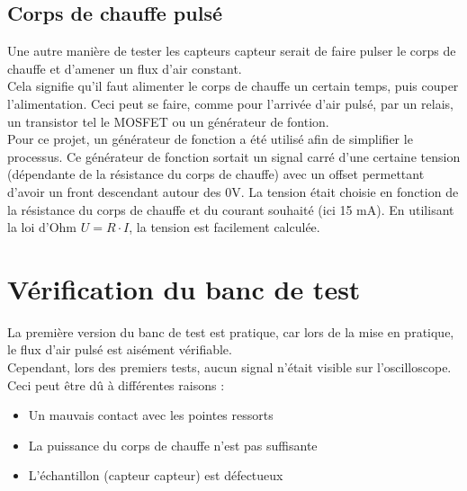 \subsection{Corps de chauffe pulsé}
Une autre manière de tester les capteurs \gls{capteur} serait de faire pulser le corps de chauffe et d'amener un flux d'air constant. \\
Cela signifie qu'il faut alimenter le corps de chauffe un certain temps, puis couper l'alimentation. Ceci peut se faire, comme pour l'arrivée
d'air pulsé, par un relais, un transistor tel le MOSFET ou un générateur de fontion. \\

Pour ce projet, un générateur de fonction a été utilisé afin de simplifier le processus. Ce générateur de fonction sortait un signal carré
d'une certaine tension (dépendante de la résistance du corps de chauffe) avec un offset permettant d'avoir un front descendant autour des
0V. La tension était choisie en fonction de la résistance du corps de chauffe et du courant souhaité (ici 15 mA). En utilisant la loi d'Ohm
$U = R\cdot I$, la tension est facilement calculée.

\section{Vérification du banc de test}
La première version du banc de test est pratique, car lors de la mise en pratique, le flux d'air pulsé est aisément vérifiable. \\
Cependant, lors des premiers tests, aucun signal n'était visible sur l'oscilloscope. Ceci peut être dû à différentes raisons :
\begin{itemize}
    \item Un mauvais contact avec les pointes ressorts\\

    \item La puissance du corps de chauffe n'est pas suffisante\\

    \item L'échantillon (capteur \gls{capteur}) est défectueux\\
\end{itemize}

